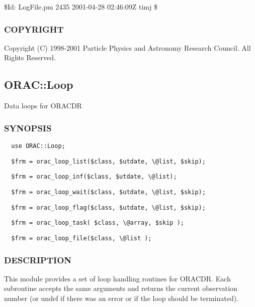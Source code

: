 \begin{description}
\$Id: LogFile.pm 2435 2001-04-28 02:46:09Z timj \$

\subsubsection*{COPYRIGHT\label{ORAC::LogFile_COPYRIGHT}}


Copyright (C) 1998-2001 Particle Physics and Astronomy Research
Council. All Rights Reserved.

\subsection{ORAC::Loop\label{ORAC::Loop}}


Data loops for ORACDR

\subsubsection*{SYNOPSIS\label{ORAC::Loop_SYNOPSIS}}
\begin{verbatim}
  use ORAC::Loop;
\end{verbatim}
\begin{verbatim}
  $frm = orac_loop_list($class, $utdate, \@list, $skip);
\end{verbatim}
\begin{verbatim}
  $frm = orac_loop_inf($class, $utdate, \@list);
\end{verbatim}
\begin{verbatim}
  $frm = orac_loop_wait($class, $utdate, \@list, $skip);
\end{verbatim}
\begin{verbatim}
  $frm = orac_loop_flag($class, $utdate, \@list, $skip);
\end{verbatim}
\begin{verbatim}
  $frm = orac_loop_task( $class, \@array, $skip );
\end{verbatim}
\begin{verbatim}
  $frm = orac_loop_file($class, \@list );
\end{verbatim}
\subsubsection*{DESCRIPTION\label{ORAC::Loop_DESCRIPTION}}


This module provides a set of loop handling routines for ORACDR.
Each subroutine accepts the same arguments and returns the current
observation number (or undef if there was an error or if the loop
should be terminated).




\end{description}
